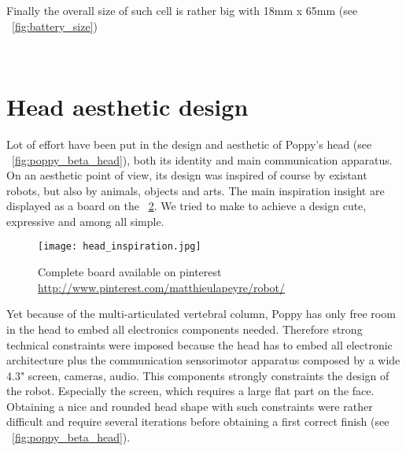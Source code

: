 Finally the overall size of such cell is rather big with 18mm x 65mm (see \figurename~\ref{fig:battery_size})

\begin{figure}[tb]
\centering
    \hfil
    \\
    \caption{}
    \label{fig:tyva_batteries}
\end{figure}



\section{Head aesthetic design} %

Lot of effort have been put in the design and aesthetic of Poppy's head (see \figurename~\ref{fig:poppy_beta_head}), both its identity and main communication apparatus.
On an aesthetic point of view, its design was inspired of course by existant robots, but also by animals, objects and arts. The main inspiration insight are displayed as a board on the \figurename~\ref{fig:head_inspiration}. We tried to make to achieve a design cute, expressive and among all simple.

\begin{figure}[p]
    \begin{center}
        \texttt{[image: head\_inspiration.jpg]}
    \end{center}
    \caption{Complete board available on pinterest \url{http://www.pinterest.com/matthieulapeyre/robot/}}
    \label{fig:head_inspiration}
\end{figure}

Yet because of the multi-articulated vertebral column, Poppy has only free room in the head to embed all electronics components needed. Therefore strong technical constraints were imposed because the head has to embed all electronic architecture plus the communication sensorimotor apparatus composed by a wide 4.3" screen, cameras, audio.
This components strongly constraints the design of the robot. Especially the screen, which requires a large flat part on the face. Obtaining a nice and rounded head shape with such constraints were rather difficult and require several iterations before obtaining a first correct finish (see \figurename~\ref{fig:poppy_beta_head}).



